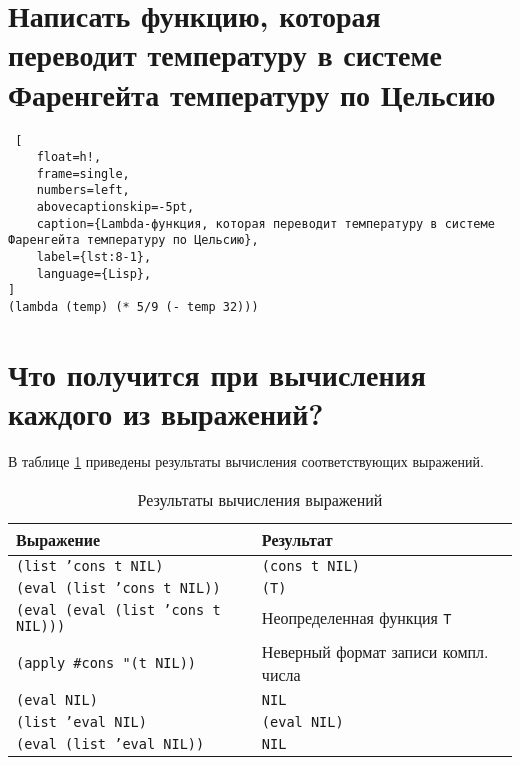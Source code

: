 \section{Написать функцию, которая переводит температуру в системе Фаренгейта температуру по Цельсию}

\begin{lstlisting} [
	float=h!,
	frame=single,
	numbers=left,
	abovecaptionskip=-5pt,
	caption={Lambda-функция, которая переводит температуру в системе Фаренгейта температуру по Цельсию},
	label={lst:8-1},
	language={Lisp},
]
(lambda (temp) (* 5/9 (- temp 32)))
\end{lstlisting}

\section{Что получится при вычисления каждого из выражений?}

В таблице \ref{tbl:9-1} приведены результаты вычисления соответствующих выражений.

\begin{table}[!ht]
    \small
	\begin{center}
		\caption{Результаты вычисления выражений}
		\label{tbl:9-1}
		\begin{tabular}{|l|l|}
			\hline
			\bfseries Выражение & \bfseries Результат \\\hline
            \texttt{(list 'cons t NIL)} & \texttt{(cons t NIL)} \\\hline
            \texttt{(eval (list 'cons t NIL))} & \texttt{(T)} \\\hline
            \texttt{(eval (eval (list 'cons t NIL)))} & Неопределенная функция \texttt{T} \\\hline
            \texttt{(apply \#cons "(t NIL))} & Неверный формат записи компл. числа \\\hline
            \texttt{(eval NIL)} & \texttt{NIL} \\\hline
            \texttt{(list 'eval NIL) } & \texttt{(eval NIL)} \\\hline
            \texttt{(eval (list 'eval NIL))} & \texttt{NIL} \\\hline
		\end{tabular}
	\end{center}
\end{table}
